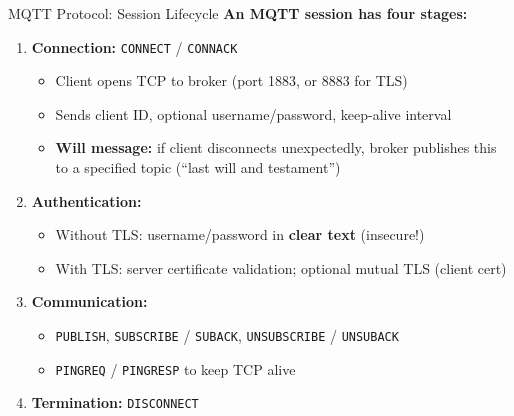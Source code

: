 \documentclass[aspectratio=169,11pt]{beamer}
\begin{document}
\begin{frame}{MQTT Protocol: Session Lifecycle}
    \textbf{An MQTT session has four stages:}
    
    \vspace{0.2cm}
    \begin{enumerate}
        \item \textbf{Connection:} \texttt{CONNECT} / \texttt{CONNACK}
        \begin{itemize}
            \item Client opens TCP to broker (port 1883, or 8883 for TLS)
            \item Sends client ID, optional username/password, keep-alive interval
            \item \textbf{Will message:} if client disconnects unexpectedly, broker publishes this to a specified topic (``last will and testament'')
        \end{itemize}
        
        \item \textbf{Authentication:}
        \begin{itemize}
            \item Without TLS: username/password in \textbf{clear text} (insecure!)
            \item With TLS: server certificate validation; optional mutual TLS (client cert)
        \end{itemize}
        
        \item \textbf{Communication:}
        \begin{itemize}
            \item \texttt{PUBLISH}, \texttt{SUBSCRIBE} / \texttt{SUBACK}, \texttt{UNSUBSCRIBE} / \texttt{UNSUBACK}
            \item \texttt{PINGREQ} / \texttt{PINGRESP} to keep TCP alive
        \end{itemize}
        
        \item \textbf{Termination:} \texttt{DISCONNECT}
    \end{enumerate}
\end{frame}
\end{document}
